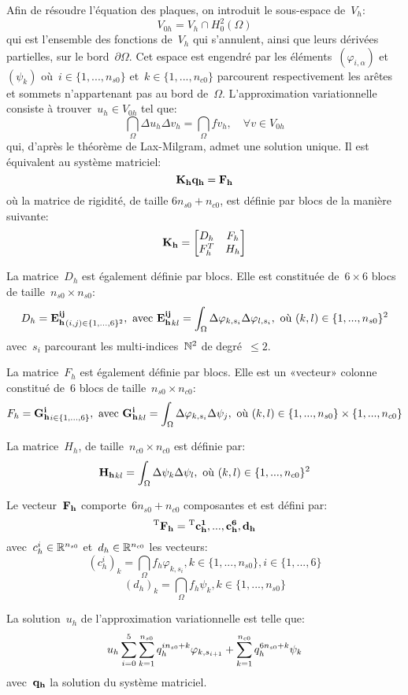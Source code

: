 Afin de résoudre l'équation des plaques, on introduit le sous-espace de~$V_h$:
\[ V_{0h}=V_h\cap H^2_0(\Omega) \]
qui est l'ensemble des fonctions de~$V_h$ qui s'annulent, ainsi que leurs dérivées partielles, sur le bord~$\partial\Omega$. Cet espace est engendré par les éléments~$(\varphi_{i,\alpha})$ et~$(\psi_k)$ où~$i\in\{1, ..., n_{s0}\}$ et~$k\in\{1, ..., n_{c0}\}$ parcourent respectivement les arêtes et sommets n'appartenant pas au bord de~$\Omega$.
L'approximation variationnelle consiste à trouver~$u_h\in V_{0h}$ tel que:
\[ \dint_\Omega \Delta u_h\Delta v_h = \dint_\Omega fv_h, \quad \forall v\in V_{0h} \]
qui, d'après le théorème de Lax-Milgram, admet une solution unique. Il est équivalent au système matriciel:
\[ \MM{K_h}\VV{q_h}=\VV{F_h} \]
où la matrice de rigidité, de taille $6n_{s0}+n_{c0}$, est définie par blocs de la manière suivante:
\[ \MM{K_h} = \MM*{D_h & F_h\\ F_h^T & H_h} \]

La matrice~$D_h$ est également définie par blocs. Elle est constituée de~$6\times6$ blocs de taille~$n_{s0}\times n_{s0}$:
\[ D_h=\MM{E_h^{ij}}_{(i,j)\in\{1, ..., 6\}^2}, \text{ avec }
 \MM{E_h^{ij}}_{kl} = \dint_\Omega \Delta\varphi_{k,s_i}\Delta\varphi_{l,s_i}, \text{ où } (k,l)\in\{1, ..., n_{s0}\}^2 \]
avec~$s_i$ parcourant les multi-indices~$\mathbb N^2$ de degré~$\le2$.

La matrice~$F_h$ est également définie par blocs. Elle est un «vecteur» colonne constitué de~$6$ blocs de taille~$n_{s0}\times n_{c0}$:
\[ F_h=\MM{G_h^i}_{i\in\{1, ..., 6\}}, \text{ avec }
 \MM{G_h^i}_{kl} = \dint_\Omega \Delta\varphi_{k,s_i}\Delta\psi_j, \text{ où } (k,l)\in\{1, ..., n_{s0}\}\times\{1, ..., n_{c0}\} \]

La matrice~$H_h$, de taille~$n_{c0}\times n_{c0}$ est définie par:
\[ \MM{H_h}_{kl} = \dint_\Omega \Delta\psi_k\Delta\psi_l, \text{ où } (k,l)\in\{1, ..., n_{c0}\}^2 \]

Le vecteur~$\VV{F_h}$ comporte~$6n_{s0}+n_{c0}$ composantes et est défini par:
\[ {}^\mathrm{T}\mathbf{F_h} = {}^\mathrm{T}\mathbf{c_h^1, ..., c_h^6, d_h}\]
avec~$c_h^i\in\mathbb R^{n_{s0}}$ et~$d_h\in\mathbb R^{n_{c0}}$ les vecteurs:
\[ (c_h^i)_k = \dint_\Omega f_h\varphi_{k,s_i}, k\in\{1, ..., n_{s0}\}, i\in\{1, ..., 6\}\]
\[ (d_h)_k = \dint_\Omega f_h\psi_k, k\in\{1, ..., n_{s0}\}\]

La solution~$u_h$ de l'approximation variationnelle est telle que:
\[ u_h\displaystyle\sum_{i=0}^5\displaystyle\sum_{k=1}^{n_{s0}} q_h^{in_{s0}+k}\varphi_{k,s_{i+1}}
+\displaystyle\sum_{k=1}^{n_{c0}} q_h^{6n_{s0}+k}\psi_k \]
avec~$\VV{q_h}$ la solution du système matriciel.



